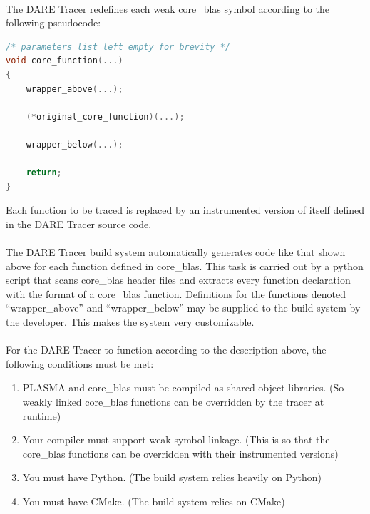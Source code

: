 \documentclass{article}
\begin{document}
\paragraph{}
The DARE Tracer redefines each weak core\_blas symbol according to the following pseudocode:

\begin{lstlisting}[language=C]
/* parameters list left empty for brevity */
void core_function(...)
{
    wrapper_above(...);
    
    (*original_core_function)(...);
    
    wrapper_below(...);
    
    return;
}
\end{lstlisting}

Each function to be traced is replaced by an instrumented version of itself defined in the DARE Tracer source code. 

\paragraph{}
The DARE Tracer build system automatically generates code like that shown above for each function defined in core\_blas. This task is carried out by a python script that scans core\_blas header files and extracts every function declaration with the format of a core\_blas function. Definitions for the functions denoted ``wrapper\_above'' and ``wrapper\_below'' may be supplied to the build system by the developer. This makes the system very customizable.

\paragraph{}
For the DARE Tracer to function according to the description above, the following conditions must be met:
\begin{enumerate}
\item{} PLASMA and core\_blas must be compiled as shared object libraries. (So weakly linked core\_blas functions can be overridden by the tracer at runtime)
\item{} Your compiler must support weak symbol linkage. (This is so that the core\_blas functions can be overridden with their instrumented versions)
\item{} You must have Python. (The build system relies heavily on Python)
\item{} You must have CMake. (The build system relies on CMake)
\end{enumerate}
\end{document}
